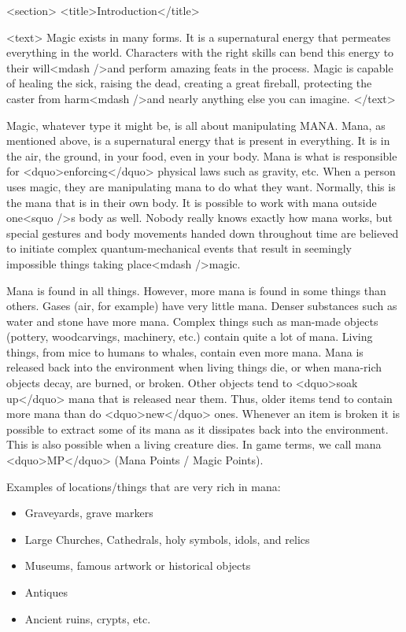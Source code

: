 <section>
  <title>Introduction</title>

  <text>
Magic exists in many forms.  It is a supernatural energy that
permeates everything in the world.  Characters with the right skills
can bend this energy to their will<mdash />and perform amazing feats in the
process.  Magic is capable of healing the sick, raising the dead,
creating a great fireball, protecting the caster from harm<mdash />and
nearly anything else you can imagine.
  </text>

Magic, whatever type it might be, is all about manipulating MANA.
Mana, as mentioned above, is a supernatural energy that is present in
everything.  It is in the air, the ground, in your food, even in your
body.  Mana is what is responsible for <dquo>enforcing</dquo> physical laws
such as gravity, etc.  When a person uses magic, they are manipulating
mana to do what they want.  Normally, this is the mana that is in
their own body.  It is possible to work with mana outside one<squo />s body
as well.  Nobody really knows exactly how mana works, but special
gestures and body movements handed down throughout time are believed
to initiate complex quantum-mechanical events that result in seemingly
impossible things taking place<mdash />magic.

Mana is found in all things.  However, more mana is found in some
things than others.  Gases (air, for example) have very little mana.
Denser substances such as water and stone have more mana.  Complex
things such as man-made objects (pottery, woodcarvings, machinery,
etc.) contain quite a lot of mana.  Living things, from mice to humans
to whales, contain even more mana.  Mana is released back into the
environment when living things die, or when mana-rich objects decay,
are burned, or broken.  Other objects tend to <dquo>soak up</dquo> mana that is
released near them.  Thus, older items tend to contain more mana than
do <dquo>new</dquo> ones.  Whenever an item is broken it is possible to extract
some of its mana as it dissipates back into the environment.  This is
also possible when a living creature dies.  In game terms, we call
mana <dquo>MP</dquo> (Mana Points / Magic Points).

Examples of locations/things that are very rich in mana:
\begin{itemize}
\item Graveyards, grave markers
\item Large Churches, Cathedrals, holy symbols, idols, and relics
\item Museums, famous artwork or historical objects
\item Antiques
\item Ancient ruins, crypts, etc.
\end{itemize}

